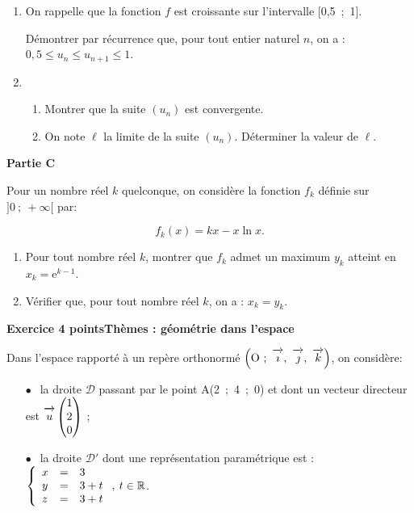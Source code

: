 \documentclass[10pt,a4paper]{article}
\newcommand{\R}{\mathbb{R}}
\newcommand{\vect}[1]{\overrightarrow{\,\mathstrut#1\,}}
\def\Oijk{$\left(\text{O}~;~\vect{\imath},~\vect{\jmath},~\vect{k}\right)$}
\begin{document}
\medskip

\begin{enumerate}
\item On rappelle que la fonction $f$ est croissante sur l'intervalle [0,5~;~1].

Démontrer par récurrence que, pour tout entier naturel $n$, on a : $0,5 \leqslant  u_n \leqslant u_{n+1} \leqslant 1$.
\item 
	\begin{enumerate}
		\item Montrer que la suite $\left(u_n\right)$ est convergente.
		\item On note $\ell$ la limite de la suite $\left(u_n\right)$. Déterminer la valeur de $\ell$.
	\end{enumerate}
\end{enumerate}

\bigskip

\textbf{Partie C}

\medskip

Pour un nombre réel $k$ quelconque, on considère la fonction $f_k$ définie sur $]0~;~+\infty[$ par:

\[f_k(x) = kx - x \ln x.\]

\begin{enumerate}
\item Pour tout nombre réel $k$, montrer que $f_k$ admet un maximum $y_k$ atteint en $x_k = \text{e}^{k- 1}$.
\item Vérifier que, pour tout nombre réel $k$, on a : $x_k = y_k$.
\end{enumerate}

\bigskip

\textbf{Exercice 4  points\hfill Thèmes : géométrie dans l'espace }

\medskip

Dans l'espace rapporté à un repère orthonormé \Oijk, on considère:

\begin{itemize}
\item[$\bullet~~$] la droite $\mathcal{D}$ passant par le point A(2~;~4~;~0) et dont un vecteur directeur est $\vect{u}\begin{pmatrix}1\\2\\0\end{pmatrix}$ ;
\item[$\bullet~~$] la droite $\mathcal{D}'$ dont une représentation paramétrique est : $\left\{\begin{array}{l c l}
x&=&3\\
y&=& 3 + t\\
z&=&3 + t
\end{array}\right. ,\: t \in \R$.
\end{itemize}
\end{document}
